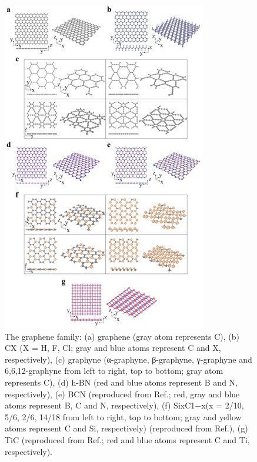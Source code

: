 \documentclass[12pt,a4paper]{report}
\begin{document}
\begin{figure}
  \centering
  \includegraphics[scale=0.3]{2.1.jpg}
  \caption{The graphene family: (a) graphene (gray atom represents C), (b) CX (X = H, F, Cl; gray and blue atoms represent C and X, respectively), (c) graphyne (α-graphyne, β-graphyne, γ-graphyne and 6,6,12-graphyne from left to right, top to bottom; gray atom represents C), (d) h-BN (red and blue atoms represent B and N, respectively), (e) BCN (reproduced from Ref.; red, gray and blue atoms represent B, C and N, respectively), (f) SixC1−x(x = 2/10, 5/6, 2/6, 14/18 from left to right, top to bottom; gray and yellow atoms represent C and Si, respectively) (reproduced from Ref.), (g) TiC (reproduced from Ref.; red and blue atoms represent C and Ti, respectively).}
  \label{graphenefam}
  \end{figure}
\end{document}
